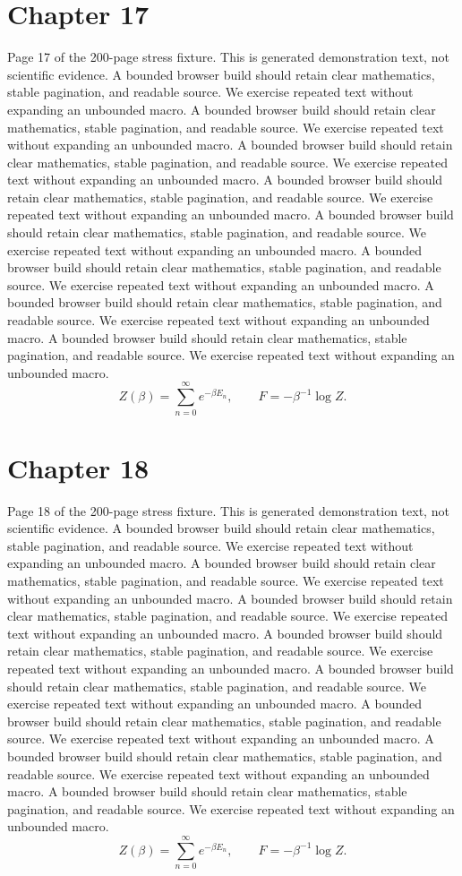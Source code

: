 \documentclass[11pt]{article}
\begin{document}
\section*{Chapter 17}
Page 17 of the 200-page stress fixture. This is generated demonstration text, not scientific evidence.
A bounded browser build should retain clear mathematics, stable pagination, and readable source. We exercise repeated text without expanding an unbounded macro.
A bounded browser build should retain clear mathematics, stable pagination, and readable source. We exercise repeated text without expanding an unbounded macro.
A bounded browser build should retain clear mathematics, stable pagination, and readable source. We exercise repeated text without expanding an unbounded macro.
A bounded browser build should retain clear mathematics, stable pagination, and readable source. We exercise repeated text without expanding an unbounded macro.
A bounded browser build should retain clear mathematics, stable pagination, and readable source. We exercise repeated text without expanding an unbounded macro.
A bounded browser build should retain clear mathematics, stable pagination, and readable source. We exercise repeated text without expanding an unbounded macro.
A bounded browser build should retain clear mathematics, stable pagination, and readable source. We exercise repeated text without expanding an unbounded macro.
A bounded browser build should retain clear mathematics, stable pagination, and readable source. We exercise repeated text without expanding an unbounded macro.
\[Z(\beta)=\sum_{n=0}^{\infty}e^{-\beta E_n},\qquad F=-\beta^{-1}\log Z.\]
\newpage
\section*{Chapter 18}
Page 18 of the 200-page stress fixture. This is generated demonstration text, not scientific evidence.
A bounded browser build should retain clear mathematics, stable pagination, and readable source. We exercise repeated text without expanding an unbounded macro.
A bounded browser build should retain clear mathematics, stable pagination, and readable source. We exercise repeated text without expanding an unbounded macro.
A bounded browser build should retain clear mathematics, stable pagination, and readable source. We exercise repeated text without expanding an unbounded macro.
A bounded browser build should retain clear mathematics, stable pagination, and readable source. We exercise repeated text without expanding an unbounded macro.
A bounded browser build should retain clear mathematics, stable pagination, and readable source. We exercise repeated text without expanding an unbounded macro.
A bounded browser build should retain clear mathematics, stable pagination, and readable source. We exercise repeated text without expanding an unbounded macro.
A bounded browser build should retain clear mathematics, stable pagination, and readable source. We exercise repeated text without expanding an unbounded macro.
A bounded browser build should retain clear mathematics, stable pagination, and readable source. We exercise repeated text without expanding an unbounded macro.
\[Z(\beta)=\sum_{n=0}^{\infty}e^{-\beta E_n},\qquad F=-\beta^{-1}\log Z.\]
\newpage
\end{document}
